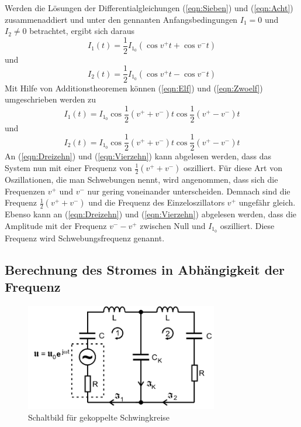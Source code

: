 \newline
Werden die Lösungen der Differentialgleichungen (\ref {eqn:Sieben}) und (\ref {eqn:Acht}) zusammenaddiert und unter den gennanten
Anfangsbedingungen $ I_1 = 0 $ und $ I_2 \neq 0 $ betrachtet, ergibt sich daraus
\begin{equation}
    I_1(t) = \frac{1}{2} I_{1_0} (\cos v^{+} t + \cos v^{-} t )
    \label{eqn:Elf}
\end{equation}
und
\begin{equation}
    I_2(t) = \frac{1}{2} I_{1_0} (\cos v^{+} t - \cos v^{-} t )
    \label{eqn:Zwoelf}
\end{equation}
Mit Hilfe von Additionstheoremen können (\ref {eqn:Elf}) und (\ref {eqn:Zwoelf}) umgeschrieben werden zu
\begin{equation}
    I_1(t) = I_{1_0} \cos \frac{1}{2} (v^{+} + v^{-}) t \cos \frac{1}{2} (v^{+} - v^{-}) t
    \label{eqn:Dreizehn}
\end{equation}
und
\begin{equation}
    I_2(t) = I_{1_0} \cos \frac{1}{2} (v^{+} + v^{-}) t \cos \frac{1}{2} (v^{+} - v^{-}) t
    \label{eqn:Vierzehn}
\end{equation}
\newline
An (\ref {eqn:Dreizehn}) und (\ref {eqn:Vierzehn}) kann abgelesen werden, dass das System nun mit einer Frequenz von $ \frac{1}{2} (v^{+} + v^{-}) $ oszilliert.
Für diese Art von Oszillationen, die man Schwebungen nennt, wird angenommen, dass sich die Frequenzen $ v^{+} $ und $ v^{-} $ nur gering voneinander unterscheiden.
Demnach sind die Frequenz $ \frac{1}{2} (v^{+} + v^{-}) $ und die Frequenz des Einzeloszillators $ v^{+} $ ungefähr gleich.
\newline
Ebenso kann an (\ref {eqn:Dreizehn}) und (\ref {eqn:Vierzehn}) abgelesen werden, dass die Amplitude mit der Frequenz $ v^{-} - v^{+} $ zwischen Null und $ I_{1_0} $ oszilliert.
Diese Frequenz wird Schwebungsfrequenz genannt.

\subsection{Berechnung des Stromes in Abhängigkeit der Frequenz}


\begin{figure}[H]
    \centering
    \includegraphics[width=0.75\textwidth]{plots/Schaltung3.png}
    \caption{Schaltbild für gekoppelte Schwingkreise \cite{Versuchsanleitung}}
    \label{fig:schaltung3}
\end{figure}

